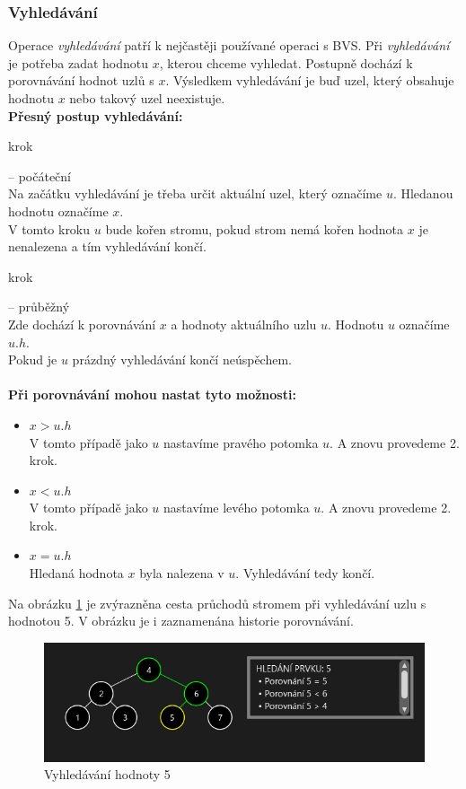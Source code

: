 \documentclass[
  biblatex=false,
  font=serif,
  glossaries=false,
  tables=false,
  theorems=false,
  index
]{kidiplom}
\begin{document}
\subsubsection{Vyhledávání}
Operace \textit{vyhledávání} patří k nejčastěji používané operaci s BVS. Při \textit{vyhledávání} je potřeba zadat hodnotu $x$, kterou chceme vyhledat. Postupně dochází k porovnávání hodnot uzlů s $x$. Výsledkem vyhledávání je buď uzel, který obsahuje hodnotu $x$ nebo takový uzel neexistuje.\\

\noindent \textbf{Přesný postup vyhledávání:}
\begin{enumerate} {\bfseries
\item  krok} -- počáteční \\
Na začátku vyhledávání je třeba určit aktuální uzel, který označíme $u$. Hledanou hodnotu označíme $x$.\\
V tomto kroku $u$ bude kořen stromu, pokud strom nemá kořen hodnota $x$ je nenalezena a tím vyhledávání končí.
{\bfseries\item  krok} -- průběžný \\
Zde dochází k porovnávání $x$ a hodnoty aktuálního uzlu $u$. Hodnotu $u$ označíme $u.h$.\\
Pokud je $u$ prázdný vyhledávání končí neúspěchem. \\\\
\textbf{Při porovnávání mohou nastat tyto možnosti:}
\begin{itemize}
\item $x > u.h$ \\
V tomto případě jako $u$ nastavíme pravého potomka $u$. A znovu provedeme 2. krok.
\newpage
\item $x < u.h$\\
V tomto případě jako $u$ nastavíme levého potomka $u$. A znovu provedeme 2. krok.
\item $x = u.h$\\
Hledaná hodnota $x$ byla nalezena v $u$. Vyhledávání tedy končí.
\end{itemize}
\end{enumerate}

\medskip
\noindent Na obrázku \ref{binarySearch} je zvýrazněna cesta průchodů stromem při vyhledávání uzlu s hodnotou 5. V obrázku je i zaznamenána historie porovnávání. 

\begin{figure}[h!]
\centering
	\includegraphics[scale=0.9]{obrazky/5BinarniVyhledavani.png}
	\caption{Vyhledávání hodnoty 5}
	\label{binarySearch}
\end{figure}
\end{document}
